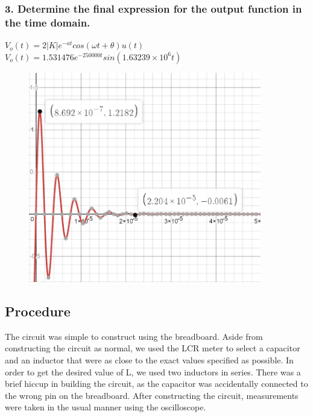 \documentclass[11pt]{article}
\begin{document}
	\subsubsection*{3. Determine the final expression for the output function in the time domain.}
	$V_{o}(t)=2|K|e^{-at}cos(\omega t+\theta)u(t)$\\
	$V_{o}(t)=1.531476e^{-250000t}sin(1.63239\times 10^{6}t)$\\
	\vspace{-15px}
	\begin{figure}[H]
		\centering
		\includegraphics[width=4in]{images/Function_Graph.png}
	\end{figure}
	
	\subsection*{Procedure}
	The circuit was simple to construct using the breadboard. Aside from constructing the circuit as normal, we used the LCR meter to select a capacitor and an inductor that were as close to the exact values specified as possible. In order to get the desired value of L, we used two inductors in series. There was a brief hiccup in building the circuit, as the capacitor was accidentally connected to the wrong pin on the breadboard. After constructing the circuit, measurements were taken in the usual manner using the oscilloscope.
\end{document}

